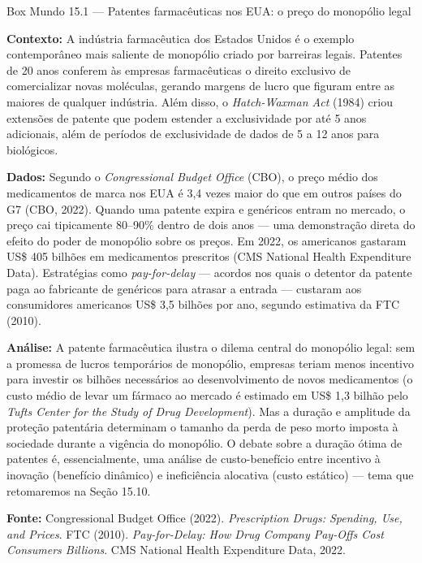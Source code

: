 \documentclass[11pt,twoside,openright]{book}
\begin{document}
\begin{boxmundobox}{Box Mundo 15.1 — Patentes farmacêuticas nos EUA: o preço do monopólio legal}

\textbf{Contexto:} A indústria farmacêutica dos Estados Unidos é o
exemplo contemporâneo mais saliente de monopólio criado por barreiras
legais. Patentes de 20 anos conferem às empresas farmacêuticas o direito
exclusivo de comercializar novas moléculas, gerando margens de lucro que
figuram entre as maiores de qualquer indústria. Além disso, o
\emph{Hatch-Waxman Act} (1984) criou extensões de patente que podem
estender a exclusividade por até 5 anos adicionais, além de períodos de
exclusividade de dados de 5 a 12 anos para biológicos.

\textbf{Dados:} Segundo o \emph{Congressional Budget Office} (CBO), o
preço médio dos medicamentos de marca nos EUA é 3,4 vezes maior do que
em outros países do G7 (CBO, 2022). Quando uma patente expira e
genéricos entram no mercado, o preço cai tipicamente 80--90\% dentro de
dois anos --- uma demonstração direta do efeito do poder de monopólio
sobre os preços. Em 2022, os americanos gastaram US\$ 405 bilhões em
medicamentos prescritos (CMS National Health Expenditure Data).
Estratégias como \emph{pay-for-delay} --- acordos nos quais o detentor
da patente paga ao fabricante de genéricos para atrasar a entrada ---
custaram aos consumidores americanos US\$ 3,5 bilhões por ano, segundo
estimativa da FTC (2010).

\textbf{Análise:} A patente farmacêutica ilustra o dilema central do
monopólio legal: sem a promessa de lucros temporários de monopólio,
empresas teriam menos incentivo para investir os bilhões necessários ao
desenvolvimento de novos medicamentos (o custo médio de levar um fármaco
ao mercado é estimado em US\$ 1,3 bilhão pelo \emph{Tufts Center for the
Study of Drug Development}). Mas a duração e amplitude da proteção
patentária determinam o tamanho da perda de peso morto imposta à
sociedade durante a vigência do monopólio. O debate sobre a duração
ótima de patentes é, essencialmente, uma análise de custo-benefício
entre incentivo à inovação (benefício dinâmico) e ineficiência alocativa
(custo estático) --- tema que retomaremos na Seção 15.10.

\textbf{Fonte:} Congressional Budget Office (2022). \emph{Prescription
Drugs: Spending, Use, and Prices}. FTC (2010). \emph{Pay-for-Delay: How
Drug Company Pay-Offs Cost Consumers Billions}. CMS National Health
Expenditure Data, 2022.

\end{boxmundobox}
\end{document}
